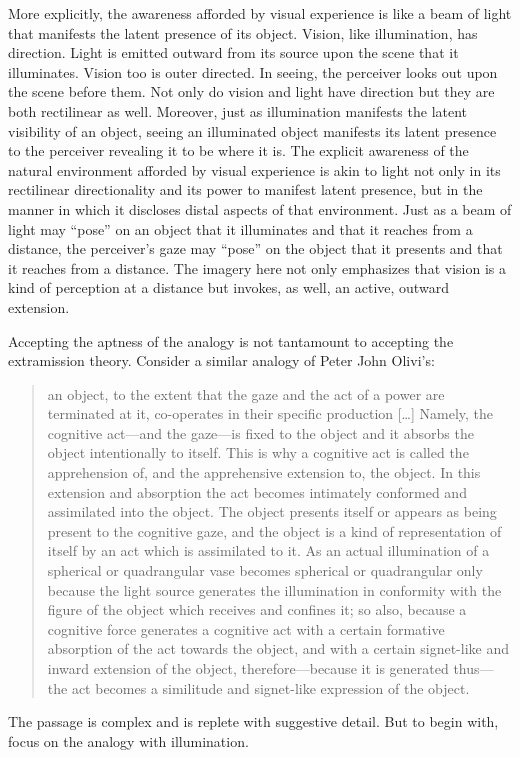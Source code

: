 \documentclass[12pt]{article}
\begin{document}
More explicitly, the awareness afforded by visual experience is like a beam of light that manifests the latent presence of its object. Vision, like illumination, has direction. Light is emitted outward from its source upon the scene that it illuminates.  Vision too is outer directed. In seeing, the perceiver looks out upon the scene before them. Not only do vision and light have direction but they are both rectilinear as well. Moreover, just as illumination manifests the latent visibility of an object, seeing an illuminated object manifests its latent presence to the perceiver revealing it to be where it is. The explicit awareness of the natural environment afforded by visual experience is akin to light not only in its rectilinear directionality and its power to manifest latent presence, but in the manner in which it discloses distal aspects of that environment. Just as a beam of light may ``pose'' on an object that it illuminates and that it reaches from a distance, the perceiver's gaze may ``pose'' on the object that it presents and that it reaches from a distance. The imagery here not only emphasizes that vision is a kind of perception at a distance but invokes, as well, an active, outward extension.

Accepting the aptness of the analogy is not tantamount to accepting the extramission theory. Consider a similar analogy of Peter John Olivi's:
\begin{quote}
	an object, to the extent that the gaze and the act of a power are terminated at it, co-operates in their specific production [\ldots] Namely, the cognitive act---and the gaze---is fixed to the object and it absorbs the object intentionally to itself. This is why a cognitive act is called the apprehension of, and the apprehensive extension to, the object. In this extension and absorption the act becomes intimately conformed and assimilated into the object. The object presents itself or appears as being present to the cognitive gaze, and the object is a kind of representation of itself by an act which is assimilated to it. As an actual illumination of a spherical or quadrangular vase becomes spherical or quadrangular only because the light source generates the illumination in conformity with the figure of the object which receives and confines it; so also, because a cognitive force generates a cognitive act with a certain formative absorption of the act towards the object, and with a certain signet-like and inward extension of the object, therefore---because it is generated thus---the act becomes a similitude and signet-like expression of the object.
\end{quote}
The passage is complex and is replete with suggestive detail. But to begin with, focus on the analogy with illumination.
\end{document}
